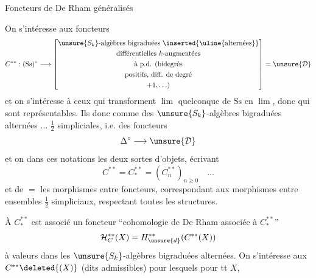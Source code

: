 \begin{center}Foncteurs de De Rham généralisés\end{center}
On s'intéresse aux foncteurs
\[
C^{**}:(\mathrm{Ss})^\circ\longrightarrow
\left[\begin{gathered}
\unsure{S_k}\text{-algèbres bigraduées }\inserted{\uline{\text{alternées}}}\\
\text{différentielles }k\text{-augmentées}\\
\text{à p.d. (bidegrés}\\
\text{positifs, diff. de degré}\\
+1,\ldots)
\end{gathered}\right]=\unsure{\mathcal D}
\]
\margin{$\unsure{\circ}$}
et on s'intéresse à ceux qui transforment \uline{$\lim$} quelconque de $\mathrm{Ss}$ en \uline{$\lim$}, donc qui sont représentables. Ils   donc   comme des $\unsure{S_k}$-algèbres bigraduées alternées $\ldots$ $\frac12$ simpliciales, i.e. des foncteurs
\[
\Delta^\circ\longrightarrow\unsure{\mathcal D}
\]
et on  dans ces notations les deux sortes d'objets, écrivant
\[
C^{**}=C_*^{**}=(C_n^{**})_{n\geq0}\quad\ldots
\]
et de $=$  les morphismes entre foncteurs, correspondant aux morphismes entre ensembles $\frac12$ simpliciaux, respectant toutes les structures.

À $C_*^{**}$ est associé un foncteur ``cohomologie de De Rham associée à $C_*^{**}$''
\[
\mathcal H_C^{**}(X)=H_{\unsure{d}}^{**}(C^{**}(X))
\]
à valeurs dans les $\unsure{S_k}$-algèbres bigraduées alternées. On s'intéresse aux $C^{**}\deleted{(X)}$ (dits admissibles) pour lesquels pour tt $X$,
